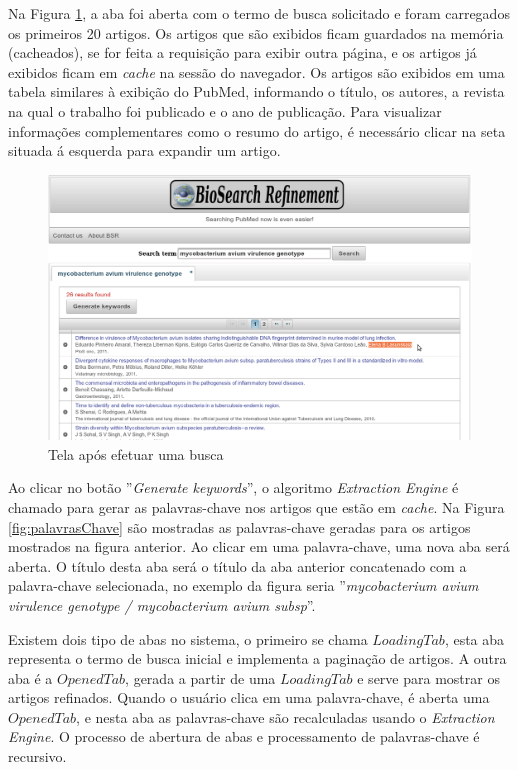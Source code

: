 Na Figura \ref{fig:telaComBusca}, a aba foi aberta com o termo de busca solicitado e foram carregados os primeiros 20 artigos. Os artigos que são exibidos ficam guardados na memória (cacheados), se for feita a requisição para exibir outra página, e os artigos já exibidos ficam em \emph{cache} na sessão do navegador. Os artigos são exibidos em uma tabela similares à exibição do PubMed, informando o título, os autores, a revista na qual o trabalho foi publicado e o ano de publicação. Para visualizar informações complementares como o resumo do artigo, é necessário clicar na seta situada á esquerda para expandir um artigo.
\begin{figure}[h!]
    \center
    \includegraphics[scale=0.35]{imagens/telaComBusca.png}
    \caption{Tela após efetuar uma busca \label{fig:telaComBusca}} 
\end{figure}

Ao clicar no botão ''\emph{Generate keywords}'', o algoritmo \emph{Extraction Engine} é chamado para gerar as palavras-chave nos artigos que estão em \emph{cache}. Na Figura \ref{fig:palavrasChave} são mostradas as palavras-chave geradas para os artigos mostrados na figura anterior. Ao clicar em uma palavra-chave, uma nova aba será aberta. O título desta aba será o título da aba anterior concatenado com a palavra-chave selecionada, no exemplo da figura seria ''\emph{mycobacterium avium virulence genotype / mycobacterium avium subsp}''.

Existem dois tipo de abas no sistema, o primeiro se chama $LoadingTab$, esta aba representa o termo de busca inicial e implementa a paginação de artigos. A outra aba é a $OpenedTab$, gerada a partir de uma $LoadingTab$ e serve para mostrar os artigos refinados. Quando o usuário clica em uma palavra-chave, é aberta uma $OpenedTab$, e nesta aba as palavras-chave são recalculadas usando o \emph{Extraction Engine}. O processo de abertura de abas e processamento de palavras-chave é recursivo. 

